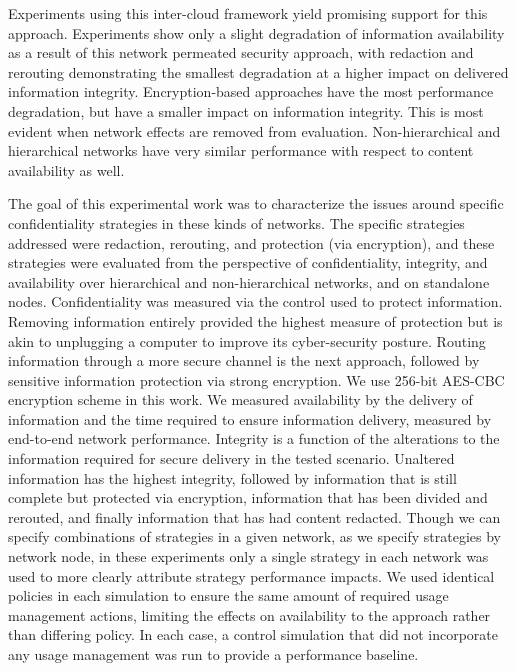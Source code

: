 Experiments using this inter-cloud framework yield promising support for this approach.  Experiments show only a slight degradation of information availability as a result of this network permeated security approach, with redaction and rerouting demonstrating the smallest degradation at a higher impact on delivered information integrity.  Encryption-based approaches have the most performance degradation, but have a smaller impact on information integrity.  This is most evident when network effects are removed from evaluation.  Non-hierarchical and hierarchical networks have very similar performance with respect to content availability as well.

The goal of this experimental work was to characterize the issues around specific confidentiality strategies in these kinds of networks.  The specific strategies addressed were redaction, rerouting, and protection (via encryption), and these strategies were evaluated from the perspective of confidentiality, integrity, and availability over hierarchical and non-hierarchical networks, and on standalone nodes. Confidentiality was measured via the control used to protect information.  Removing information entirely provided the highest measure of protection but is akin to unplugging a computer to improve its cyber-security posture.   Routing information through a more secure channel is the next approach, followed by sensitive information protection via strong encryption.  We use 256-bit AES-CBC encryption scheme in this work.  We measured availability by the delivery of information and the time required to ensure information delivery, measured by end-to-end network performance.  Integrity is a function of the alterations to the information required for secure delivery in the tested scenario.  Unaltered information has the highest integrity, followed by information that is still complete but protected via encryption, information that has been divided and rerouted, and finally information that has had content redacted.  Though we can specify combinations of strategies in a given network, as we specify strategies by network node, in these experiments only a single strategy in each network was used to more clearly attribute strategy performance impacts. We used identical policies in each simulation to ensure the same amount of required usage management actions, limiting the effects on availability to the approach rather than differing policy.  In each case, a control simulation that did not incorporate any usage management was run to provide a performance baseline.  

